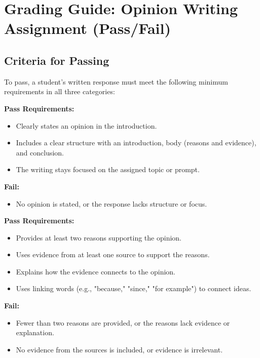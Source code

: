 \documentclass[12pt]{article}
\begin{document}
\section*{Grading Guide: Opinion Writing Assignment (Pass/Fail)}

\subsection*{Criteria for Passing}

To pass, a student’s written response must meet the following minimum requirements in all three categories:

\begin{tcolorbox}[colframe=black!60, colback=white, title=Purpose, Focus, and Organization]
\textbf{Pass Requirements:}
\begin{itemize}
    \item Clearly states an opinion in the introduction.
    \item Includes a clear structure with an introduction, body (reasons and evidence), and conclusion.
    \item The writing stays focused on the assigned topic or prompt.
\end{itemize}

\textbf{Fail:}
\begin{itemize}
    \item No opinion is stated, or the response lacks structure or focus.
\end{itemize}
\end{tcolorbox}

\begin{tcolorbox}[colframe=black!60, colback=white, title=Evidence and Elaboration]
\textbf{Pass Requirements:}
\begin{itemize}
    \item Provides at least two reasons supporting the opinion.
    \item Uses evidence from at least one source to support the reasons.
    \item Explains how the evidence connects to the opinion.
    \item Uses linking words (e.g., "because," "since," "for example") to connect ideas.
\end{itemize}

\textbf{Fail:}
\begin{itemize}
    \item Fewer than two reasons are provided, or the reasons lack evidence or explanation.
    \item No evidence from the sources is included, or evidence is irrelevant.
\end{itemize}
\end{tcolorbox}
\end{document}
